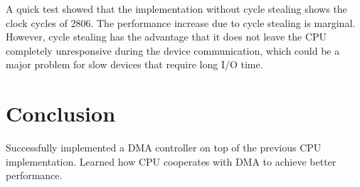 \documentclass[12pt]{article}
\begin{document}
A quick test showed that the implementation without cycle stealing
shows the clock cycles of 2806.  The performance increase due to cycle
stealing is marginal.  However, cycle stealing has the advantage that
it does not leave the CPU completely unresponsive during the device
communication, which could be a major problem for slow devices that
require long I/O time.

\section{Conclusion}
Successfully implemented a DMA controller on top of the previous CPU
implementation.  Learned how CPU cooperates with DMA to achieve better
performance.
\end{document}
